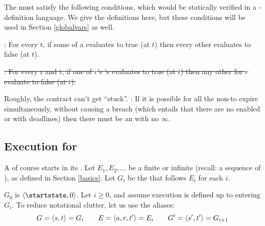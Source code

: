 \documentclass[12pt]{article}
\begin{document}
The \TGuards must satisfy the following conditions, which would be statically verified in a \Contract-definition language. We give the \FSContracts definitions here, but these conditions will be used in Section \ref{globalvars} as well.
\medskip

\noindent {}: For every \TimeStamp t, if some \TGuard of a \mustnarule evaluates to true (at $t$) then every other \TGuard evaluates to false (at $t$).
\medskip

\noindent \sout{: For every \Role r and \TimeStamp t, if one of $r$'s \rmustnarules's \TGuards evaluates to true (at $t$) then any other \rmustnarules for $r$ evaluate to false (at $t$).}
\medskip

Roughly, the contract can't get ``stuck''. 
\noindent {}: If it is possible for all the \enabled non-\Env \actionrules to expire simultaneously, without causing a breach (which entails that there are no enabled \mustnarules or \rmustnarules with deadlines) then there must be an \envarule with no \Deadline $\infty$.
\smallskip



%


\subsection{Execution for \FSContracts} \label{fscontractexec}
A \FSContract of course starts in its \startstate. Let $E_1, E_2, \dots$ be a finite or infinite \trace (recall: a sequence of \Events), as defined in Section \ref{basics}. Let $G_i$ be the \GlobalState that follows $E_i$ for each $i$.

$G_0$ is $\tup{\startstate, 0}$.
Let $i \geq 0$, and assume execution is defined up to entering $G_i$. To reduce notational clutter, let us use the aliases:
\[ G = \langle s,t\rangle = G_i  \qquad E = \langle a,r,t'\rangle = E_i \qquad  G' = \langle s',t'\rangle = G_{i+1}\]
\end{document}
